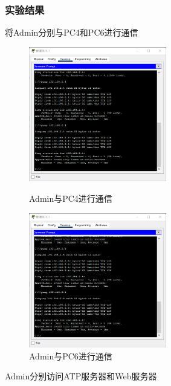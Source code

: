 \documentclass{imutthesis}
\begin{document}
\subsubsection{实验结果}
将Admin分别与PC4和PC6进行通信
\begin{figure}[h]
    \centering
    \begin{minipage}[t]{0.48\textwidth}
        \centering
        \includegraphics[width=6cm]{PC4.png}
        \caption{Admin与PC4进行通信}
    \end{minipage}
    \begin{minipage}[t]{0.48\textwidth}
        \centering
        \includegraphics[width=6cm]{PC6.png}
        \caption{Admin与PC6进行通信}
    \end{minipage}
\end{figure}

Admin分别访问ATP服务器和Web服务器
\end{document}

